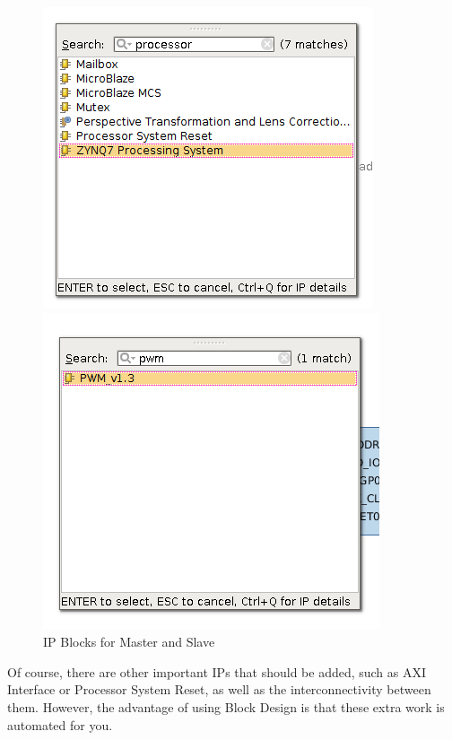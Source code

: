 \documentclass{article}
\begin{document}
\begin{itemize}
\begin{enumerate}
 \begin{figure}[h!]
\centering
\begin{minipage}{.425\textwidth}
  \centering
  \includegraphics[width=0.8\linewidth]{img/diag_processor.png}
\end{minipage}%
\begin{minipage}{.425\textwidth}
  \centering
  \includegraphics[width=0.8\linewidth]{img/diagram_pwm.png}
\end{minipage}
\caption{IP Blocks for Master and Slave}
\label{fig:diagram}
\end{figure}


Of course, there are other important IPs that should be added, such as AXI Interface or Processor System Reset, as well as the interconnectivity between them. However, the advantage of using Block Design is that these extra work is automated for you. 



\end{enumerate}
\end{itemize}
\end{document}
